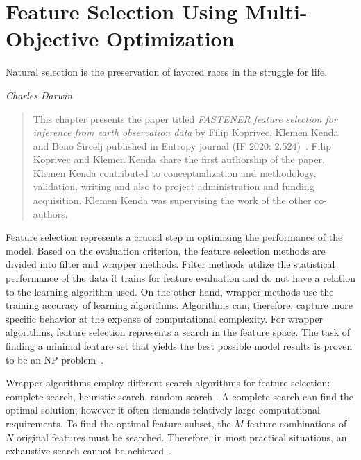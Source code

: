 % 
\chapter{Feature Selection Using Multi-Objective Optimization}
\label{ch:feature-selection}

\epigraph{Natural selection is the preservation of favored races in the struggle for life.}{\textit{Charles Darwin}}

\begin{quote}
This chapter presents the paper titled \textit{FASTENER feature selection for inference from earth observation data} by Filip Koprivec, Klemen Kenda and Beno Šircelj published in Entropy journal (IF 2020: 2.524)~\cite{koprivec:2020:fastener}.
Filip Koprivec and Klemen Kenda share the first authorship of the paper.
Klemen Kenda contributed to conceptualization and methodology, validation, writing and also to project administration and funding acquisition. 
Klemen Kenda was supervising the work of the other co-authors.
\end{quote}

Feature selection represents a crucial step in optimizing the performance of the model.
Based on the evaluation criterion, the feature selection methods are divided into filter and wrapper methods.
Filter methods utilize the statistical performance of the data it trains for feature evaluation and do not have a relation to the learning algorithm used.
On the other hand, wrapper methods use the training accuracy of learning algorithms.
Algorithms can, therefore, capture more specific behavior at the expense of computational complexity.
For wrapper algorithms, feature selection represents a search in the feature space.
The task of finding a minimal feature set that yields the best possible model results is proven to be an NP problem~\cite{hua:2009:performance}.

Wrapper algorithms employ different search algorithms for feature selection: complete search, heuristic search, random search \cite{jia:2022:feature}.
A complete search can find the optimal solution; however it often demands relatively large computational requirements.
To find the optimal feature subset, the $M$-feature combinations of $N$ original features must be searched. 
Therefore, in most practical situations, an exhaustive search cannot be achieved~\cite{jia:2022:feature}.


